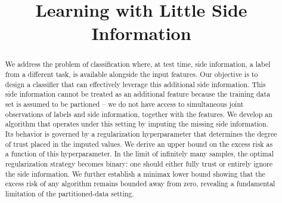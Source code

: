 \documentclass{article}
\numberwithin{equation}{section}
\theoremstyle{plain}
\theoremstyle{definition}
\theoremstyle{remark}
\begin{document}
\title{Learning with Little Side Information}





\begin{abstract}
We address the problem of classification where, at test time, side information, a label from a different task, is available alongside the input features. Our objective is to design a classifier that can effectively leverage this additional side information. This side information cannot be treated as an additional feature because the training data set is assumed to be partioned -- we do not have access to simultaneous joint observations of labels and side information, together with the features. We develop an algorithm that operates under this setting by imputing the missing side information. Its behavior is governed by a regularization hyperparameter that determines the degree of trust placed in the imputed values. We derive an upper bound on the excess risk as a function of this hyperparameter.
In the limit of infinitely many samples, the optimal regularization strategy becomes binary: one should either fully trust or entirely ignore the side information. 
We further establish a minimax lower bound showing that the excess risk of any algorithm remains bounded away from zero, revealing a fundamental limitation of the partitioned-data setting.
\end{abstract}
\end{document}

